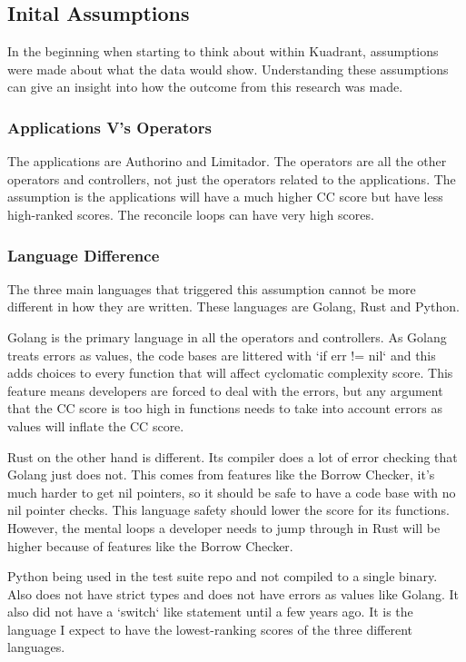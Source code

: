 \subsection{Inital Assumptions}
In the beginning when starting to think about \cc within Kuadrant, assumptions were made about what the data would show.
Understanding these assumptions can give an insight into how the outcome from this research was made.

\subsubsection{Applications V's Operators}
The applications are Authorino and Limitador.
The operators are all the other operators and controllers, not just the operators related to the applications.
The assumption is the applications will have a much higher CC score but have less high-ranked scores.
The reconcile loops can have very high \cc scores.

\subsubsection{Language Difference}
The three main languages that triggered this assumption cannot be more different in how they are written.
These languages are Golang, Rust and Python.

Golang is the primary language in all the operators and controllers.
As Golang treats errors as values, the code bases are littered with `if err != nil` and this adds choices to every function that will affect cyclomatic complexity score.
This feature means developers are forced to deal with the errors, but any argument that the CC score is too high in functions needs to take into account errors as values will inflate the CC score.

Rust on the other hand is different.
Its compiler does a lot of error checking that Golang just does not.
This comes from features like the Borrow Checker, it’s much harder to get nil pointers, so it should be safe to have a code base with no nil pointer checks.
This language safety should lower the \cc score for its functions.
However, the mental loops a developer needs to jump through in Rust will be higher because of features like the Borrow Checker.

Python being used in the test suite repo and not compiled to a single binary.
Also does not have strict types and does not have errors as values like Golang.
It also did not have a `switch` like statement until a few years ago.
It is the language I expect to have the lowest-ranking scores of the three different languages.


